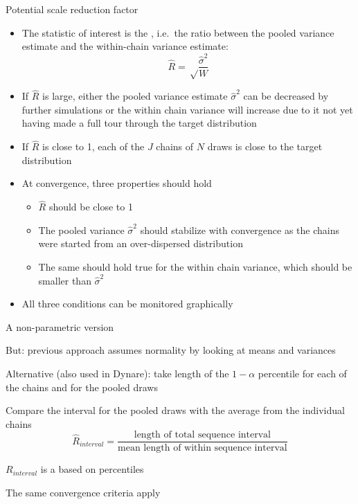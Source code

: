 \begin{frame}{Potential scale reduction factor}
\begin{itemize}
    \item The statistic of interest is the , i.e.\ the ratio between the pooled variance estimate and the within-chain variance estimate:
    \begin{equation}
    \hat R = \sqrt \frac{{{{\hat \sigma }^2}}}{W}
    \end{equation}
    \item If $\hat R$ is large, either the pooled variance estimate $\hat \sigma^2$ can be decreased by further simulations or the within chain variance will increase due to it not yet having made a full tour through the target distribution
    \item If $\hat R$ is close to 1, each of the $J$ chains of $N$ draws is close to the target distribution
    \item At convergence, three properties should hold
    \begin{itemize}
      \item $\hat R$ should be close to 1
      \item The pooled variance $\hat \sigma^2$ should stabilize with convergence as the chains were started from an over-dispersed distribution
      \item The same should hold true for the within chain variance, which should be smaller than $\hat \sigma^2$
    \end{itemize}
    \item All three conditions can be monitored graphically
\end{itemize}
\end{frame}

\begin{frame}{A non-parametric version}
\begin{witemize}
    \item But: previous approach assumes normality by looking at means and variances
    \item Alternative (also used in Dynare): take length of the $1-\alpha$ percentile for each of the chains and for the pooled draws
    \item Compare the interval for the pooled draws with the average from the individual chains
    \begin{equation}
    \hat R_{interval} = \frac{\text{length of total sequence interval}}{\text{mean length of within sequence interval}}
    \end{equation}
    \item $R_{interval}$ is a  based on percentiles
    \item The same convergence criteria apply
\end{witemize}
\end{frame}



